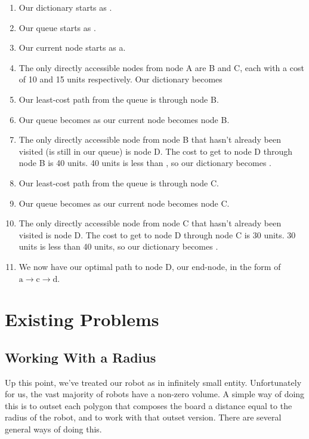 \documentclass[letterpaper, 12pt]{article}
\begin{document}
\begin{multicols}{2}
\begin{enumerate}
    \item Our dictionary starts as .
    \item Our queue starts as .
    \item Our current node starts as a.
    \item The only directly accessible nodes from node A are B and C, each with
          a cost of 10 and 15 units respectively. Our dictionary becomes
    \item Our least-cost path from the queue is through node B.
    \item Our queue becomes  as our current node becomes node B.
    \item The only directly accessible node from node B that hasn't already been
          visited (is still in our queue) is node D. The cost to get to node D
          through node B is 40 units. 40 units is less than \pyinf, so our
          dictionary becomes .
    \item Our least-cost path from the queue is through node C.
    \item Our queue becomes  as our current node becomes node C.
    \item The only directly accessible node from node C that hasn't already been
          visited is node D. The cost to get to node D through node C is 30
          units. 30 units is less than 40 units, so our dictionary becomes
          .
    \item We now have our optimal path to node D, our end-node, in the form of
          \(\mathrm{a}\to\mathrm{c}\to\mathrm{d}\).
\end{enumerate}

\section{Existing Problems}

\subsection{Working With a Radius}

Up this point, we've treated our robot as in infinitely small entity.
Unfortunately for us, the vast majority of robots have a non-zero volume. A
simple way of doing this is to outset each polygon that composes the board a
distance equal to the radius of the robot, and to work with that outset version.
There are several general ways of doing this.


\end{multicols}
\end{document}
